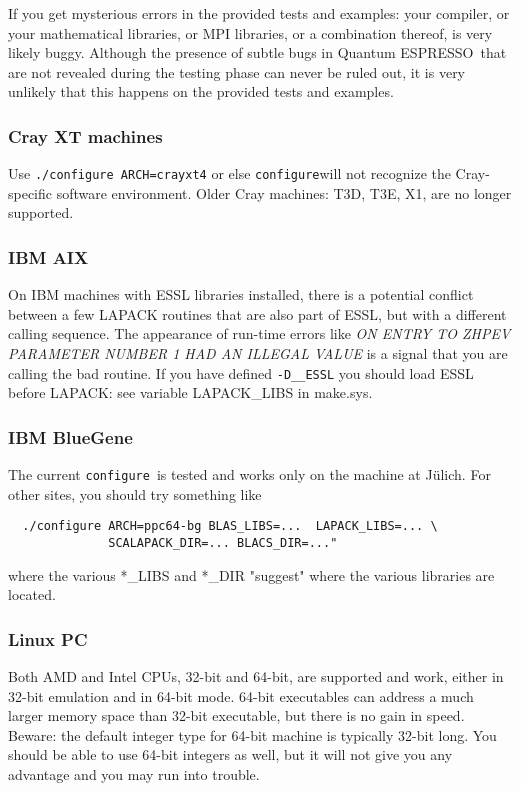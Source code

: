 \documentclass[12pt,a4paper]{article}
\def\qe{{\sc Quantum ESPRESSO}}
\def\configure{\texttt{configure}}
\begin{document}
If you get mysterious errors in the provided tests and examples:
your compiler, or your mathematical libraries, or MPI libraries,
or a combination thereof, is very likely buggy. Although the 
presence of subtle bugs in \qe\ that are not revealed during 
the testing phase can never be ruled out, it is very unlikely
that this happens on the provided tests and examples. 

\subsubsection{Cray XT machines}

Use \texttt{./configure ARCH=crayxt4} or else \configure will
not recognize the Cray-specific software environment. Older Cray 
machines: T3D, T3E, X1, are no longer supported.

\subsubsection{IBM AIX}
On IBM machines with ESSL libraries installed, there is a 
potential conflict between a few LAPACK routines that are also part of ESSL, 
but with a different calling sequence. The appearance of run-time errors like {\em
    ON ENTRY TO ZHPEV  PARAMETER NUMBER  1 HAD AN ILLEGAL VALUE}
is a signal that you are calling the bad routine. If you have defined 
\texttt{-D\_\_ESSL} you should load ESSL before LAPACK: see
variable LAPACK\_LIBS in make.sys.

\subsubsection{IBM BlueGene}

The current \configure\ is tested and works only on the machine at
J\"ulich. For other sites, you should try something like
\begin{verbatim}
  ./configure ARCH=ppc64-bg BLAS_LIBS=...  LAPACK_LIBS=... \
              SCALAPACK_DIR=... BLACS_DIR=..."
\end{verbatim}
where the various *\_LIBS and *\_DIR "suggest" where the various libraries 
are located.

\subsubsection{Linux PC}

Both AMD and Intel CPUs, 32-bit and 64-bit, are supported and work,
either in 32-bit emulation and in 64-bit mode. 64-bit executables 
can address a much larger memory space than 32-bit executable, but
there is no gain in speed.
Beware: the default integer type for 64-bit machine is typically
32-bit long. You should be able to use 64-bit integers as well, 
but it will not give you any advantage and you may run into trouble.
\end{document}
